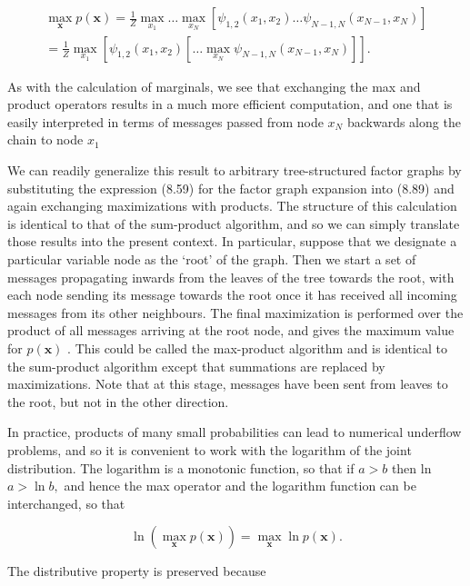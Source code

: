 \documentclass[
  10
]{article}
\begin{document}
\[
\begin{array}{l} \underset {\mathbf {x}} {\max} p (\mathbf {x}) = \frac {1}{Z} \underset {x _ {1}} {\max} \dots \underset {x _ {N}} {\max} \left[ \psi_ {1, 2} (x _ {1}, x _ {2}) \dots \psi_ {N - 1, N} (x _ {N - 1}, x _ {N}) \right] \\ = \frac {1}{Z} \underset {x _ {1}} {\max} \left[ \psi_ {1, 2} (x _ {1}, x _ {2}) \left[ \dots \underset {x _ {N}} {\max} \psi_ {N - 1, N} (x _ {N - 1}, x _ {N}) \right] \right]. \end{array}
\]

As with the calculation of marginals, we see that exchanging the max and
product operators results in a much more efficient computation, and one
that is easily interpreted in terms of messages passed from node
\(x _ { N }\) backwards along the chain to node \(x _ { 1 }\)

We can readily generalize this result to arbitrary tree-structured
factor graphs by substituting the expression (8.59) for the factor graph
expansion into (8.89) and again exchanging maximizations with products.
The structure of this calculation is identical to that of the
sum-product algorithm, and so we can simply translate those results into
the present context. In particular, suppose that we designate a
particular variable node as the `root' of the graph. Then we start a set
of messages propagating inwards from the leaves of the tree towards the
root, with each node sending its message towards the root once it has
received all incoming messages from its other neighbours. The final
maximization is performed over the product of all messages arriving at
the root node, and gives the maximum value for \(p ( \mathbf { x } )\) .
This could be called the max-product algorithm and is identical to the
sum-product algorithm except that summations are replaced by
maximizations. Note that at this stage, messages have been sent from
leaves to the root, but not in the other direction.

In practice, products of many small probabilities can lead to numerical
underflow problems, and so it is convenient to work with the logarithm
of the joint distribution. The logarithm is a monotonic function, so
that if \(a > b\) then ln \(a > \ln b ,\) and hence the max operator and
the logarithm function can be interchanged, so that

\[
\ln \left(\max _ {\mathbf {x}} p (\mathbf {x})\right) = \max _ {\mathbf {x}} \ln p (\mathbf {x}).\tag{8.91}
\]

The distributive property is preserved because
\end{document}
